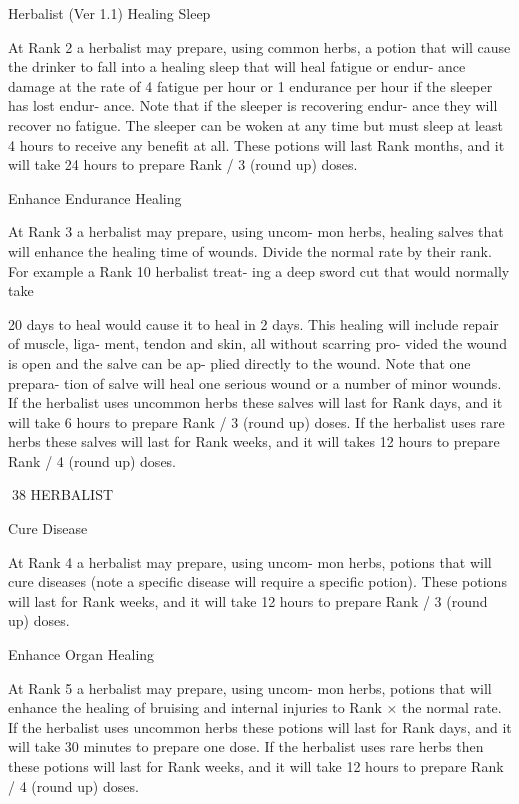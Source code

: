 \begin{Chapter}{Herbalist (Ver 1.1)}
Healing Sleep 

At Rank 2 a herbalist may prepare, using common 
herbs,  a  potion  that  will  cause  the  drinker  to  fall 
into a healing sleep that will heal fatigue or endur-
ance damage  at  the  rate  of  4  fatigue per  hour  or 1 
endurance  per  hour  if  the  sleeper  has  lost  endur-
ance.  Note  that  if  the  sleeper  is  recovering  endur-
ance  they  will  recover  no  fatigue.  The  sleeper  can 
be  woken  at  any  time  but  must  sleep  at  least  4 
hours  to  receive  any  benefit  at  all.  These  potions 
will last Rank months, and it will take 24 hours to 
prepare Rank / 3 (round up) doses. 

Enhance Endurance Healing 

At  Rank  3  a  herbalist  may  prepare,  using  uncom-
mon  herbs,  healing  salves  that  will  enhance  the 
healing time of wounds. Divide the normal rate by 
their  rank.  For  example  a  Rank  10  herbalist  treat-
ing a deep sword cut that would normally take 

20  days  to  heal  would  cause  it  to  heal  in  2  days. 
This  healing  will  include  repair  of  muscle,  liga-
ment,  tendon  and  skin,  all  without  scarring  pro-
vided  the  wound  is  open  and  the  salve  can  be  ap-
plied directly to the wound. Note that one prepara-
tion  of  salve  will  heal  one  serious  wound  or  a 
number  of  minor  wounds.  If  the  herbalist  uses 
uncommon  herbs  these  salves  will  last  for  Rank 
days,  and  it  will  take  6  hours  to  prepare  Rank  /  3 
(round  up)  doses.  If  the  herbalist  uses  rare  herbs 
these  salves  will  last  for  Rank  weeks,  and  it  will 
takes  12  hours  to  prepare  Rank  /  4  (round  up) 
doses. 

38 HERBALIST 

Cure Disease 

At  Rank  4  a  herbalist  may  prepare,  using  uncom-
mon  herbs,  potions  that  will  cure  diseases  (note  a 
specific  disease  will  require  a  specific  potion). 
These potions will last for Rank weeks, and it will 
take 12 hours to prepare Rank / 3 (round up) doses. 

Enhance Organ Healing 

At  Rank  5  a  herbalist  may  prepare,  using  uncom-
mon herbs, potions that will enhance the healing of 
bruising and internal injuries to Rank × the normal 
rate.  If  the  herbalist  uses  uncommon  herbs  these 
potions will last for Rank days, and it will take 30 
minutes  to  prepare  one  dose.  If  the  herbalist  uses 
rare  herbs  then  these  potions  will  last  for  Rank 
weeks, and it will take 12 hours to prepare Rank / 4 
(round up) doses. 


\end{Chapter}
